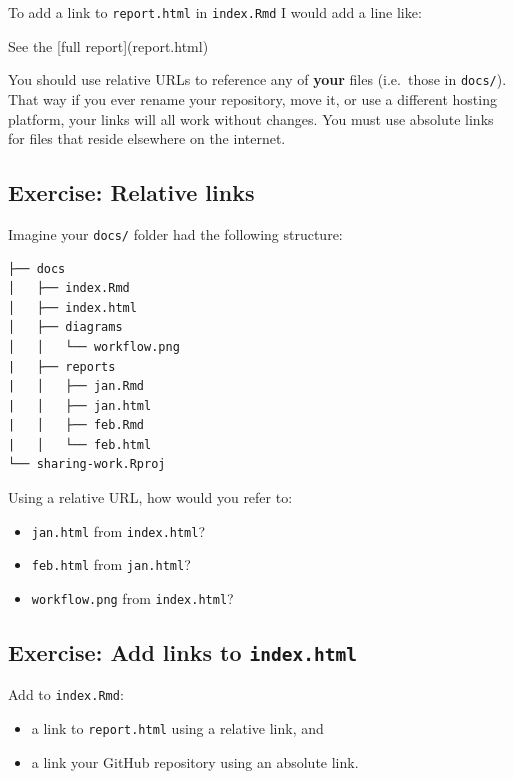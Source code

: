\documentclass[]{Nemilov}
\newenvironment{Shaded}{\begin{snugshade}}{\end{snugshade}}
\newcommand{\NormalTok}[1]{#1}
\newcommand{\OtherTok}[1]{\textcolor[rgb]{0.56,0.35,0.01}{#1}}
\providecommand{\tightlist}{%
  \setlength{\itemsep}{0pt}\setlength{\parskip}{0pt}}
\begin{document}
To add a link to \texttt{report.html} in \texttt{index.Rmd} I would add a line like:

\begin{Shaded}
\begin{Highlighting}[]
\NormalTok{See the }\OtherTok{[full report](report.html)}
\end{Highlighting}
\end{Shaded}

You should use relative URLs to reference any of \textbf{your} files (i.e.~those in \texttt{docs/}). That way if you ever rename your repository, move it, or use a different hosting platform, your links will all work without changes. You must use absolute links for files that reside elsewhere on the internet.

\hypertarget{exercise-relative-links}{%
\subsection{Exercise: Relative links}\label{exercise-relative-links}}

Imagine your \texttt{docs/} folder had the following structure:

\begin{verbatim}
├── docs
│   ├── index.Rmd
│   ├── index.html
│   ├── diagrams
│   │   └── workflow.png
|   ├── reports
|   │   ├── jan.Rmd
|   │   ├── jan.html
|   │   ├── feb.Rmd
|   │   └── feb.html
└── sharing-work.Rproj
\end{verbatim}

Using a relative URL, how would you refer to:

\begin{itemize}
\tightlist
\item
  \texttt{jan.html} from \texttt{index.html}?
\item
  \texttt{feb.html} from \texttt{jan.html}?
\item
  \texttt{workflow.png} from \texttt{index.html}?
\end{itemize}

\hypertarget{exercise-add-links-to-index.html}{%
\subsection{\texorpdfstring{Exercise: Add links to \texttt{index.html}}{Exercise: Add links to index.html}}\label{exercise-add-links-to-index.html}}

Add to \texttt{index.Rmd}:

\begin{itemize}
\tightlist
\item
  a link to \texttt{report.html} using a relative link, and
\item
  a link your GitHub repository using an absolute link.
\end{itemize}
\end{document}

